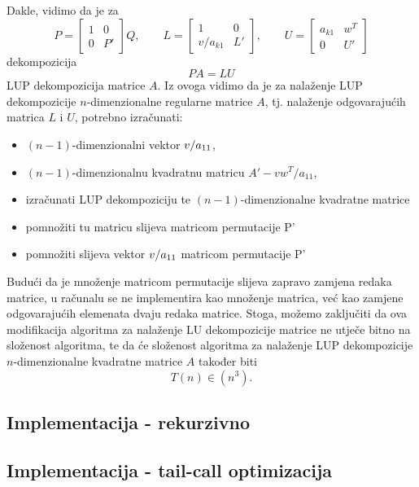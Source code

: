\documentclass[a4paper,12pt,oneside]{article}
\begin{document}
Dakle, vidimo da je za
$$
 P = \left[\begin{array}{cc}1 &0 \\
 	0 & P' \end{array}\right]Q, \qquad  L =  \left[\begin{array}{cc}1 & 0 \\
	v/a_{k1} &L' \end{array}\right], \qquad  U = \left[\begin{array}{cc}a_{k1} & w^T \\
	0 & U' \end{array}\right] 
$$
dekompozicija
$$PA = LU$$
LUP dekompozicija matrice $A$.
\noindent Iz ovoga vidimo da je za nalaženje LUP dekompozicije $n$-dimenzionalne regularne matrice $A$, tj. nalaženje odgovarajućih matrica $L$ i $U$, potrebno izračunati:
\begin{itemize}
	\item $(n-1)$-dimenzionalni vektor $v/a_{\newline11}$,
	\item $(n-1)$-dimenzionalnu kvadratnu matricu $A' - vw^T/a_{11}$,
	\item izračunati LUP dekompoziciju te  $(n-1)$-dimenzionalne kvadratne matrice
	\item pomnožiti tu matricu slijeva matricom permutacije P'
	\item pomnožiti slijeva vektor $v/a_{\newline11}$ matricom permutacije P'
\end{itemize}
Budući da je množenje matricom  permutacije slijeva zapravo zamjena redaka matrice, u računalu se ne implementira kao množenje matrica, već kao zamjene odgovarajućih elemenata dvaju redaka matrice. Stoga, možemo zaključiti da ova modifikacija algoritma za nalaženje LU dekompozicije matrice ne utječe bitno na složenost algoritma, te da će složenost algoritma za nalaženje LUP dekompozicije $n$-dimenzionalne kvadratne matrice $A$ također biti
$$T(n)\in (n^3).$$
\subsection*{Implementacija - rekurzivno}



\subsection*{Implementacija - tail-call optimizacija}


\end{document}
